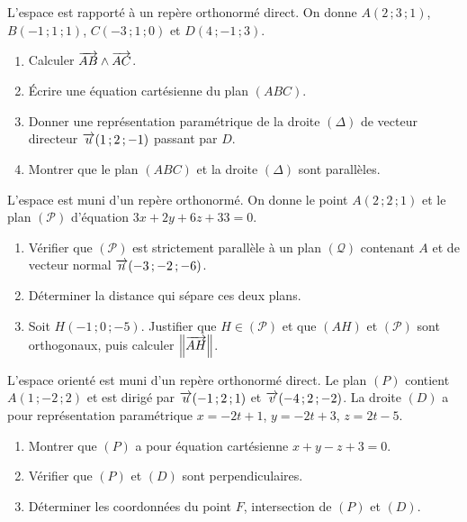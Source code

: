 \begin{annales}
L'espace est rapporté à un repère orthonormé direct. On donne
$A(2\,;3\,;1)$, $B(-1\,;1\,;1)$, $C(-3\,;1\,;0)$ et $D(4\,;-1\,;3)$.
\begin{enumerate}[label=\textbf{\arabic*)}, leftmargin=*, itemsep=0.15em]
  \item Calculer $\overrightarrow{AB} \wedge \overrightarrow{AC}$.
  \item Écrire une équation cartésienne du plan $(ABC)$.
  \item Donner une représentation paramétrique de la droite $(\Delta)$ de
        vecteur directeur $\overrightarrow{u}(1\,;2\,;-1)$ passant par $D$.
  \item Montrer que le plan $(ABC)$ et la droite $(\Delta)$ sont parallèles.
\end{enumerate}

L'espace est muni d'un repère orthonormé. On donne le point $A(2\,;2\,;1)$ et
le plan $(\mathcal P)$ d'équation $3x+2y+6z+33 = 0$.
\begin{enumerate}[label=\textbf{\arabic*)}, leftmargin=*, itemsep=0.15em]
  \item Vérifier que $(\mathcal P)$ est strictement parallèle à un plan
        $(\mathcal Q)$ contenant $A$ et de vecteur normal
        $\overrightarrow{n}(-3\,;-2\,;-6)$.
  \item Déterminer la distance qui sépare ces deux plans.
  \item Soit $H(-1\,;0\,;-5)$. Justifier que $H \in (\mathcal P)$ et que
        $(AH)$ et $(\mathcal P)$ sont orthogonaux, puis calculer
        $\left\lVert \overrightarrow{AH} \right\rVert$.
\end{enumerate}

L'espace orienté est muni d'un repère orthonormé direct. Le plan $(P)$
contient $A(1\,;-2\,;2)$ et est dirigé par $\overrightarrow{u}(-1\,;2\,;1)$ et
$\overrightarrow{v}(-4\,;2\,;-2)$. La droite $(D)$ a pour représentation paramétrique
$x = -2t+1$, $y = -2t+3$, $z = 2t-5$.
\begin{enumerate}[label=\textbf{\arabic*)}, leftmargin=*, itemsep=0.15em]
  \item Montrer que $(P)$ a pour équation cartésienne $x+y-z+3 = 0$.
  \item Vérifier que $(P)$ et $(D)$ sont perpendiculaires.
  \item Déterminer les coordonnées du point $F$, intersection de $(P)$ et
        $(D)$.
\end{enumerate}


\end{annales}
